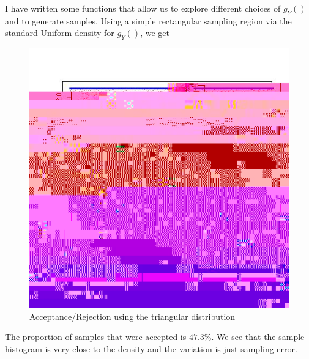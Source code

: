 \documentclass{article}
\begin{document}
I have written some functions that allow us to explore different
choices of $g_Y()$ and to generate samples.
Using a simple rectangular sampling region
via the standard Uniform density for $g_Y()$,
we get
\begin{figure}[htbp]
  \begin{center}
    \leavevmode
    \includegraphics{ARSBetaUnif.jpg}
    \caption{Acceptance/Rejection using the triangular distribution}
    \label{fig:betaUnif.jpg}
  \end{center}
\end{figure}
The proportion of samples that were accepted is $47.3\%$.
We see that the sample histogram is very close to the
density and the variation is just sampling error.
\end{document}
